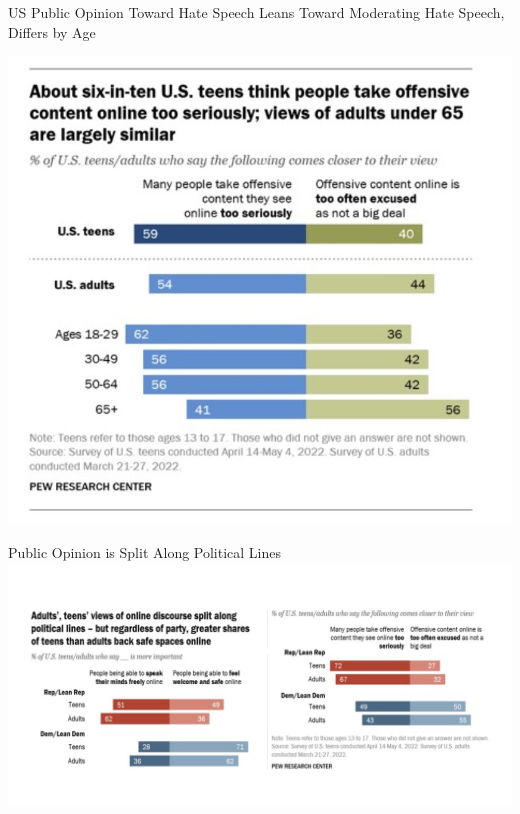 \documentclass[nobackground,dvipsnames,table]{beamer}
\begin{document}
\begin{frame}{US Public Opinion Toward Hate Speech Leans Toward Moderating Hate Speech, Differs by Age}

\begin{center}
    \includegraphics[scale=.5]{img/fig9.jpg}
\end{center}


\end{frame}


\begin{frame}{Public Opinion is Split Along Political Lines}
\hspace*{-6ex}
\includegraphics[scale=.33]{img/fig10.jpg}

\end{frame}
\end{document}
